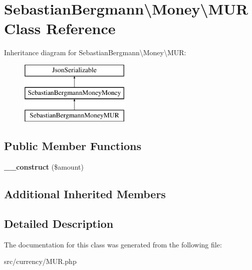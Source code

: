 \hypertarget{classSebastianBergmann_1_1Money_1_1MUR}{}\section{Sebastian\+Bergmann\textbackslash{}Money\textbackslash{}M\+U\+R Class Reference}
\label{classSebastianBergmann_1_1Money_1_1MUR}
Inheritance diagram for Sebastian\+Bergmann\textbackslash{}Money\textbackslash{}M\+U\+R\+:\begin{figure}[H]
\begin{center}
\leavevmode
\includegraphics[height=3.000000cm]{classSebastianBergmann_1_1Money_1_1MUR}
\end{center}
\end{figure}
\subsection*{Public Member Functions}
\begin{DoxyCompactItemize}
\item 
\hypertarget{classSebastianBergmann_1_1Money_1_1MUR_af9305072d08efbd613f4b4f13b8302b4}{}{\bfseries \+\_\+\+\_\+construct} (\$amount)\label{classSebastianBergmann_1_1Money_1_1MUR_af9305072d08efbd613f4b4f13b8302b4}

\end{DoxyCompactItemize}
\subsection*{Additional Inherited Members}


\subsection{Detailed Description}


The documentation for this class was generated from the following file\+:\begin{DoxyCompactItemize}
\item 
src/currency/M\+U\+R.\+php\end{DoxyCompactItemize}
